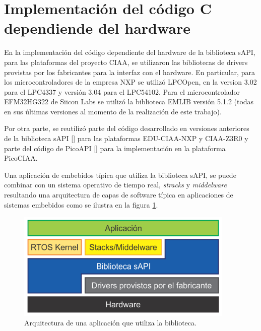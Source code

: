 \section{Implementación del código C dependiende del hardware}
\label{sec:codeImplementation}


En la implementación del código dependiente del hardware de la biblioteca sAPI, para las plataformas del proyecto CIAA, se utilizaron las bibliotecas de drivers provistas por los fabricantes para la interfaz con el hardware. En particular, para los microcontroladores de la empresa NXP se utilizó LPCOpen, en la version 3.02 para el LPC4337 y versión 3.04 para el LPC54102. Para el microcontrolador EFM32HG322 de Siicon Labs se utilizó la biblioteca EMLIB versión 5.1.2 (todas en sus últimas versiones al momento de la realización de este trabajo).

Por otra parte, se reutilizó parte del código desarrollado en versiones anteriores de la biblioteca sAPI [] para las plataformas EDU-CIAA-NXP y CIAA-Z3R0 y parte del código de PicoAPI [] para la implementación en la plataforma PicoCIAA.

Una aplicación de embebidos típica que utiliza la biblioteca sAPI, se puede combinar con un sistema operativo de tiempo real, \emph{stracks} y \emph{middelware} resultando una arquitectura de capas de software típica en aplicaciones de sistemas embebidos como se ilustra en la figura \ref{fig:sapiCapas2}.

\begin{figure}[!htbp]
\begin{center}  %
\includegraphics*[width=10.4cm]{Figures/sapiCapas2.png}
\par\caption{Arquitectura de una aplicación que utiliza la biblioteca.}\label{fig:sapiCapas2}
\end{center}
\end{figure}
